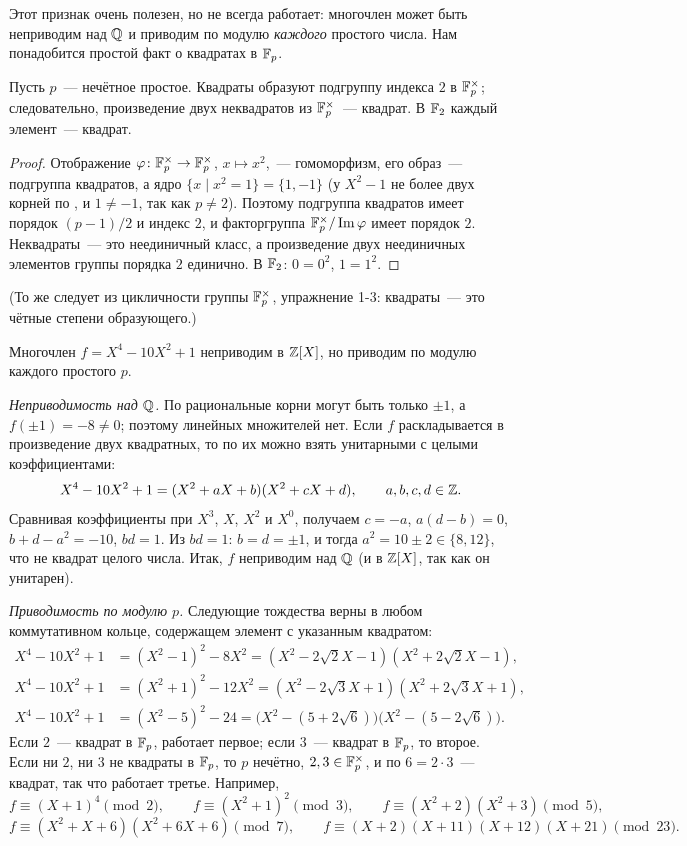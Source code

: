 Этот признак очень полезен, но не всегда работает: многочлен может быть неприводим над $\mathbb Q$ и приводим по модулю
\emph{каждого} простого числа. Нам понадобится простой факт о квадратах в $\mathbb F_p$.

\begin{lemma}[1.18b]
Пусть $p$~--- нечётное простое. Квадраты образуют подгруппу индекса $2$ в $\mathbb F_p^\times$; следовательно, произведение двух
неквадратов из $\mathbb F_p^\times$~--- квадрат. В $\mathbb F_2$ каждый элемент~--- квадрат.
\end{lemma}

\begin{proof}
Отображение $\varphi\colon\mathbb F_p^\times\to\mathbb F_p^\times$, $x\mapsto x^2$,~--- гомоморфизм, его образ~--- подгруппа квадратов,
а ядро $\{x\mid x^2=1\}=\{1,-1\}$ (у $X^2-1$ не более двух корней по , и $1\ne-1$, так как $p\ne2$). Поэтому
подгруппа квадратов имеет порядок $(p-1)/2$ и индекс $2$, и факторгруппа $\mathbb F_p^\times/\operatorname{Im}\varphi$ имеет
порядок $2$. Неквадраты~--- это неединичный класс, а произведение двух неединичных элементов группы порядка $2$
единично. В $\mathbb F_2$: $0=0^2$, $1=1^2$.
\end{proof}

(То же следует из цикличности группы $\mathbb F_p^\times$, упражнение 1-3: квадраты~--- это чётные степени образующего.)

\begin{example}[1.18c]
Многочлен $f=X^4-10X^2+1$ неприводим в $\mathbb Z[X]$, но приводим по модулю каждого простого $p$.

\emph{Неприводимость над $\mathbb Q$.} По  рациональные корни могут быть только $\pm1$, а $f(\pm1)=-8\ne0$; поэтому
линейных множителей нет. Если $f$ раскладывается в произведение двух квадратных, то по  их можно взять
унитарными с целыми коэффициентами:
\[
X^4-10X^2+1=(X^2+aX+b)(X^2+cX+d),\qquad a,b,c,d\in\mathbb Z .
\]
Сравнивая коэффициенты при $X^3$, $X$, $X^2$ и $X^0$, получаем $c=-a$, $a(d-b)=0$, $b+d-a^2=-10$, $bd=1$. Из $bd=1$:
$b=d=\pm1$, и тогда $a^2=10\pm2\in\{8,12\}$, что не квадрат целого числа. Итак, $f$ неприводим над $\mathbb Q$ (и в $\mathbb Z[X]$,
так как он унитарен).

\emph{Приводимость по модулю $p$.} Следующие тождества верны в любом коммутативном кольце, содержащем элемент с
указанным квадратом:
\begin{align*}
X^4-10X^2+1&=(X^2-1)^2-8X^2=(X^2-2\sqrt2X-1)(X^2+2\sqrt2X-1),\\
X^4-10X^2+1&=(X^2+1)^2-12X^2=(X^2-2\sqrt3X+1)(X^2+2\sqrt3X+1),\\
X^4-10X^2+1&=(X^2-5)^2-24=\bigl(X^2-(5+2\sqrt6)\bigr)\bigl(X^2-(5-2\sqrt6)\bigr).
\end{align*}
Если $2$~--- квадрат в $\mathbb F_p$, работает первое; если $3$~--- квадрат в $\mathbb F_p$, то второе. Если ни $2$, ни $3$ не квадраты
в $\mathbb F_p$, то $p$ нечётно, $2,3\in\mathbb F_p^\times$, и по  $6=2\cdot3$~--- квадрат, так что работает третье. Например,
\[
f\equiv(X+1)^4\pmod2,\qquad f\equiv(X^2+1)^2\pmod3,\qquad f\equiv(X^2+2)(X^2+3)\pmod5,
\]
\[
f\equiv(X^2+X+6)(X^2+6X+6)\pmod7,\qquad f\equiv(X+2)(X+11)(X+12)(X+21)\pmod{23}.
\]
\end{example}

